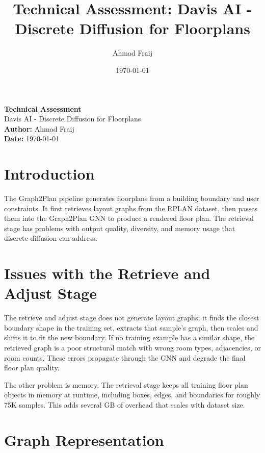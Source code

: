 \documentclass[11pt]{article}
\title{Technical Assessment: Davis AI - Discrete Diffusion for Floorplans}
\author{Ahmad Fraij}
\date{\today}
\begin{document}
\begin{titlepage}
    \centering
    \vspace*{2cm}

    {\LARGE \textbf{Technical Assessment}}\\[0.5cm]
    {\Large Davis AI - Discrete Diffusion for Floorplans}\\[2cm]

    {\large \textbf{Author:} Ahmad Fraij}\\[0.5cm]
    {\large \textbf{Date:} \today}\\[3cm]

    \vfill

\end{titlepage}


\section{Introduction}

The Graph2Plan pipeline generates floorplans from a building boundary and user constraints. It first retrieves layout graphs from the RPLAN dataset, then passes them into the Graph2Plan GNN to produce a rendered floor plan. The retrieval stage has problems with output quality, diversity, and memory usage that discrete diffusion can address.

\section{Issues with the Retrieve and Adjust Stage}

The retrieve and adjust stage does not generate layout graphs; it finds the closest boundary shape in the training set, extracts that sample's graph, then scales and shifts it to fit the new boundary. If no training example has a similar shape, the retrieved graph is a poor structural match with wrong room types, adjacencies, or room counts. These errors propagate through the GNN and degrade the final floor plan quality.

The other problem is memory. The retrieval stage keeps all training floor plan objects in memory at runtime, including boxes, edges, and boundaries for roughly 75K samples. This adds several GB of overhead that scales with dataset size.

\section{Graph Representation}
\end{document}
